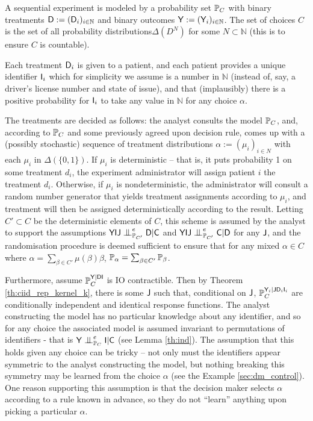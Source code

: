 \begin{example}\label{ex:randomised_experiment}
A sequential experiment is modeled by a probability set $\mathbb{P}_C$ with binary treatments $\mathsf{D}:=(\mathsf{D}_i)_{i\in \mathbb{N}}$ and binary outcomes $\mathsf{Y}:=(\mathsf{Y}_i)_{i\in\mathbb{N}}$. The set of choices $C$ is the set of all probability distributions$\Delta(D^N)$ for some $N\subset\mathbb{N}$ (this is to ensure $C$ is countable).

Each treatment $\mathsf{D}_i$ is given to a patient, and each patient provides a unique identifier $\mathsf{I}_i$ which for simplicity we assume is a number in $\mathbb{N}$ (instead of, say, a driver's license number and state of issue), and that (implausibly) there is a positive probability for $\mathsf{I}_i$ to take any value in $\mathbb{N}$ for any choice $\alpha$.

The treatments are decided as follows: the analyst consults the model $\mathbb{P}_C$, and, according to $\mathbb{P}_C$ and some previously agreed upon decision rule, comes up with a (possibly stochastic) sequence  of treatment distributions $\alpha:=(\mu_i)_{i\in N}$ with each $\mu_i$ in $\Delta(\{0,1\})$. If $\mu_i$ is deterministic -- that is, it puts probability 1 on some treatment $d_i$, the experiment administrator will assign patient $i$ the treatment $d_i$. Otherwise, if $\mu_i$ is nondeterministic, the administrator will consult a random number generator that yields treatment assignments according to $\mu_i$, and treatment will then be assigned deterministically according to the result. Letting $C'\subset C$ be the deterministic elements of $C$, this scheme is assumed by the analyst to support the assumptions $\RV{YIJ}\CI^e_{\prob{P}_{C'}} \RV{D}|\RV{C}$ and $\RV{YIJ}\CI^e_{\prob{P}_{C'}} \RV{C}|\RV{D}$ for any $\mathsf{J}$, and the randomisation procedure is deemed sufficient to ensure that for any mixed $\alpha\in C$ where $\alpha = \sum_{\beta\in C'} \mu(\beta) \beta$, $\mathbb{P}_\alpha = \sum_{\beta\in C'} \mathbb{P}_\beta$.

Furthermore, assume $\mathbb{P}_C^{\mathsf{Y}|\mathsf{DI}}$ is IO contractible. Then by Theorem \ref{th:ciid_rep_kernel_k}, there is some $\mathsf{J}$ such that, conditional on $\mathsf{J}$, $\mathbb{P}_C^{\mathsf{Y}_i|\mathsf{J}\mathsf{D}_i\mathsf{I}_i}$ are conditionally independent and identical response functions. The analyst constructing the model has no particular knowledge about any identifier, and so for any choice the associated model is assumed invariant to permutations of identifiers - that is $\RV{Y}\CI^e_{\prob{P}_C} \RV{I}|\RV{C}$ (see Lemma \ref{th:ind}). The assumption that this holds given any choice can be tricky -- not only must the identifiers appear symmetric to the analyst constructing the model, but nothing breaking this symmetry may be learned from the choice $\alpha$ (see the Example \ref{sec:dm_control}). One reason supporting this assumption is that the decision maker selects $\alpha$ according to a rule known in advance, so they do not ``learn'' anything upon picking a particular $\alpha$.


\end{example}

